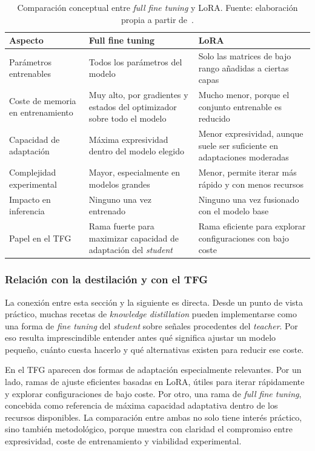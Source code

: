 \begin{table}[H]
\centering
\caption{Comparación conceptual entre \textit{full fine tuning} y LoRA. Fuente: elaboración propia a partir de~\cite{hu2021lora}.}
\label{tab:ft-vs-lora}
\footnotesize
\begin{tabularx}{\textwidth}{>{\raggedright\arraybackslash}p{3.0cm} >{\raggedright\arraybackslash}X >{\raggedright\arraybackslash}X}
\toprule
\textbf{Aspecto} & \textbf{Full fine tuning} & \textbf{LoRA} \\
\midrule
Parámetros entrenables & Todos los parámetros del modelo & Solo las matrices de bajo rango añadidas a ciertas capas \\
\addlinespace
Coste de memoria en entrenamiento & Muy alto, por gradientes y estados del optimizador sobre todo el modelo & Mucho menor, porque el conjunto entrenable es reducido \\
\addlinespace
Capacidad de adaptación & Máxima expresividad dentro del modelo elegido & Menor expresividad, aunque suele ser suficiente en adaptaciones moderadas \\
\addlinespace
Complejidad experimental & Mayor, especialmente en modelos grandes & Menor, permite iterar más rápido y con menos recursos \\
\addlinespace
Impacto en inferencia & Ninguno una vez entrenado & Ninguno una vez fusionado con el modelo base \\
\addlinespace
Papel en el TFG & Rama fuerte para maximizar capacidad de adaptación del \textit{student} & Rama eficiente para explorar configuraciones con bajo coste \\
\bottomrule
\end{tabularx}
\end{table}

\subsubsection{Relación con la destilación y con el TFG}

La conexión entre esta sección y la siguiente es directa. Desde un punto de vista práctico, muchas recetas de \textit{knowledge distillation} pueden implementarse como una forma de \textit{fine tuning} del \textit{student} sobre señales procedentes del \textit{teacher}. Por eso resulta imprescindible entender antes qué significa ajustar un modelo pequeño, cuánto cuesta hacerlo y qué alternativas existen para reducir ese coste.

En el TFG aparecen dos formas de adaptación especialmente relevantes. Por un lado, ramas de ajuste eficientes basadas en LoRA, útiles para iterar rápidamente y explorar configuraciones de bajo coste. Por otro, una rama de \textit{full fine tuning}, concebida como referencia de máxima capacidad adaptativa dentro de los recursos disponibles. La comparación entre ambas no solo tiene interés práctico, sino también metodológico, porque muestra con claridad el compromiso entre expresividad, coste de entrenamiento y viabilidad experimental.

